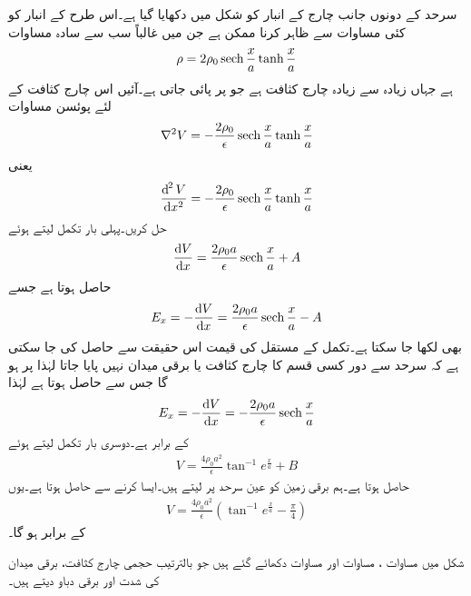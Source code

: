 سرحد کے دونوں جانب چارج کے انبار کو شکل میں دکھایا گیا ہے۔اس طرح کے انبار کو کئی مساوات سے ظاہر کرنا ممکن ہے جن میں غالباً سب سے سادہ مساوات
\begin{align}\label{مساوات_لاپلاس_ڈایوڈ_چارج-کثافت}
\rho=2 \rho_0 \operatorname{sech} \frac{x}{a} \tanh \frac{x}{a}
\end{align}
ہے جہاں زیادہ سے زیادہ چارج کثافت  ہے جو  پر پائی جاتی ہے۔آئیں اس چارج کثافت کے لئے پوئسن مساوات
\begin{align*}
\nabla^2 V=-\frac{2 \rho_0}{\epsilon} \operatorname{sech} \frac{x}{a} \tanh \frac{x}{a}
\end{align*}
یعنی
\begin{align*}
\frac{\dif^{\hspace{1pt}2} V}{\dif x^2}=-\frac{2 \rho_0}{\epsilon} \sech \frac{x}{a} \tanh \frac{x}{a}
\end{align*}
 حل کریں۔پہلی بار تکمل لیتے ہوئے
\begin{align*}
\frac{\dif V}{\dif x}=\frac{2\rho_0 a}{\epsilon} \sech \frac{x}{a}+A
\end{align*}
حاصل ہوتا  ہے جسے
\begin{align*}
E_x=-\frac{\dif V}{\dif x}=\frac{2\rho_0 a}{\epsilon} \sech \frac{x}{a}-A
\end{align*}
بھی لکھا جا سکتا ہے۔تکمل کے مستقل  کی قیمت اس حقیقت سے حاصل کی جا سکتی ہے کہ سرحد سے دور کسی قسم کا چارج کثافت یا برقی میدان نہیں پایا جاتا لہٰذا  پر  ہو گا جس سے  حاصل ہوتا ہے لہٰذا
 \begin{align}\label{مساوات_لاپلاس_ڈایوڈ_برقی_میدان}
E_x=-\frac{\dif V}{\dif x}=-\frac{2\rho_0 a}{\epsilon} \sech \frac{x}{a}
\end{align}
کے برابر ہے۔دوسری بار تکمل لیتے ہوئے
\begin{align*}
V=\frac{4 \rho_0 a^2}{\epsilon} \tan^{-1} e^{\frac{x}{a}}+B
\end{align*}
حاصل ہوتا ہے۔ہم برقی زمین کو عین سرحد پر لیتے ہیں۔ایسا کرنے سے  حاصل ہوتا ہے۔یوں
\begin{align}\label{مساوات_لاپلاس_ڈایوڈ_برقی_دباو}
V=\frac{4 \rho_0 a^2}{\epsilon} \left(\tan^{-1} e^{\frac{x}{a}}-\frac{\pi}{4}\right)
\end{align}
کے برابر ہو گا۔

شکل میں مساوات ، مساوات  اور مساوات  دکھائے گئے ہیں جو بالترتیب حجمی چارج کثافت، برقی میدان کی شدت اور برقی دباو دیتے ہیں۔

